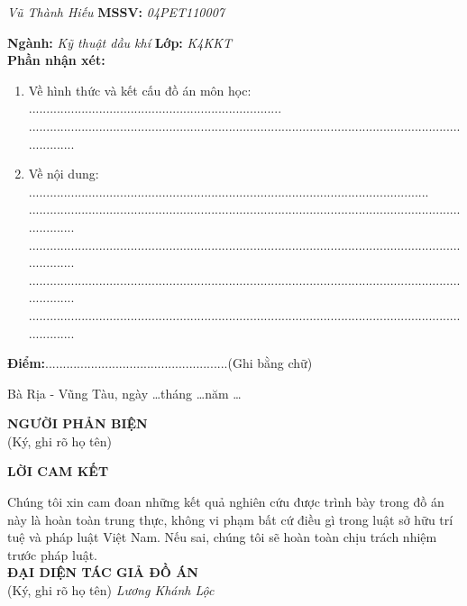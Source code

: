 \documentclass[12pt,a4paper]{article}
\begin{document}
\hspace{68pt} \textit{Vũ Thành Hiếu} \hspace{114pt} \textbf{MSSV:} \textit{04PET110007} \par
\textbf{Ngành:} \textit{Kỹ thuật dầu khí} \hspace{138pt} \textbf{Lớp:} \textit{K4KKT}
\\ \textbf{Phần nhận xét:}
\begin{enumerate}
	\item Về hình thức và kết cấu đồ án môn học: ........................................................................\\........................................................................................................................................
	\item Về nội dung: ..................................................................................................................\\........................................................................................................................................\\........................................................................................................................................\\........................................................................................................................................\\........................................................................................................................................
\end{enumerate}
\textbf{Điểm:}....................................................(Ghi bằng chữ)
\begin{flushright}
Bà Rịa - Vũng Tàu, ngày \ldots tháng \ldots năm \ldots \\
\end{flushright}
\hspace{260pt} \textbf{NGƯỜI PHẢN BIỆN}\\
\hspace*{273pt} (Ký, ghi rõ họ tên)
\newpage
\begin{center}
	\centering
	\textbf{LỜI CAM KẾT}
\end{center}
Chúng tôi xin cam đoan những kết quả nghiên cứu được trình bày trong đồ án này là hoàn toàn trung thực, không vi phạm bất cứ điều gì trong luật sở hữu trí tuệ và pháp luật Việt Nam. Nếu sai, chúng tôi sẽ hoàn toàn chịu trách nhiệm trước pháp luật.\\
\hspace*{250pt} \textbf{ĐẠI DIỆN TÁC GIẢ ĐỒ ÁN}\\
\hspace*{280pt} (Ký, ghi rõ họ tên)
\newline
\newline
\hspace*{282pt} \textit{Lương Khánh Lộc}
\end{document}
